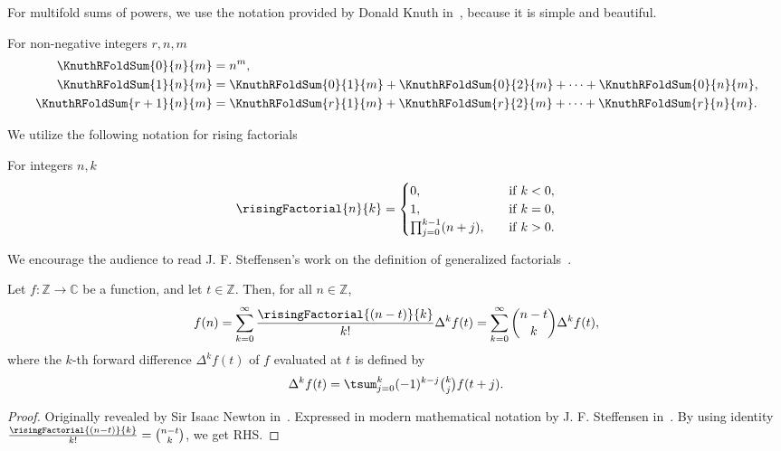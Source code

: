 For multifold sums of powers, we use the notation provided by Donald Knuth in~\cite{knuth1993johann},
because it is simple and beautiful.
\begin{definition} 
  \label{def:multifold-sums-of-powers-recurrence}
  For non-negative integers $r,n,m$
  \begin{align*}
    \KnuthRFoldSum{0}{n}{m}   &= n^m, \\
    \KnuthRFoldSum{1}{n}{m}   &= \KnuthRFoldSum{0}{1}{m}
    + \KnuthRFoldSum{0}{2}{m} + \cdots + \KnuthRFoldSum{0}{n}{m}, \\
    \KnuthRFoldSum{r+1}{n}{m} &= \KnuthRFoldSum{r}{1}{m}
    + \KnuthRFoldSum{r}{2}{m} + \cdots + \KnuthRFoldSum{r}{n}{m}.
  \end{align*}
\end{definition}

We utilize the following notation for rising factorials
\begin{definition}
  \label{def:rising-factorials}
  For integers $n,k$
  \begin{align*}
    \risingFactorial{n}{k} =
    \begin{cases}
      0, \quad & \mathrm{if \; } k < 0, \\
      1, \quad & \mathrm{if \; } k = 0, \\
      \prod_{j=0}^{k-1} (n+j), \quad & \mathrm{if \; } k>0.
    \end{cases}
  \end{align*}
\end{definition}
We encourage the audience to read
J. F. Steffensen's work on the definition of
generalized factorials~\cite{steffensen1933definition}.

\begin{lemma}
  \label{lem:forward-newtons-formula}
  Let $f\colon \mathbb{Z} \to \mathbb{C}$ be a function,
  and let $t \in \mathbb{Z}$.
  Then, for all $n \in \mathbb{Z}$,
  \begin{align*}
    f(n)
    = \sum_{k=0}^{\infty} \frac{\risingFactorial{(n-t)}{k}}{k!} \Delta^{k} f(t)
    = \sum_{k=0}^{\infty} \binom{n-t}{k} \Delta^{k} f(t),
  \end{align*}
  where the $k$-th forward difference $\Delta^{k} f(t)$ of $f$
  evaluated at $t$ is defined by
  \begin{align*}
    \Delta^{k} f(t)
    = \tsum_{j=0}^{k} (-1)^{k-j} \tbinom{k}{j} f(t+j).
  \end{align*}
  \begin{proof}
    Originally revealed by Sir Isaac Newton in~\cite{newton1850newton}.
    Expressed in modern mathematical notation by J. F. Steffensen
    in~\cite[section 2, eq. (19)]{steffensen1927interpolation}.
    By using identity
    $\frac{\risingFactorial{(n-t)}{k}}{k!} = \binom{n-t}{k}$,
    we get RHS.
  \end{proof}
\end{lemma}

